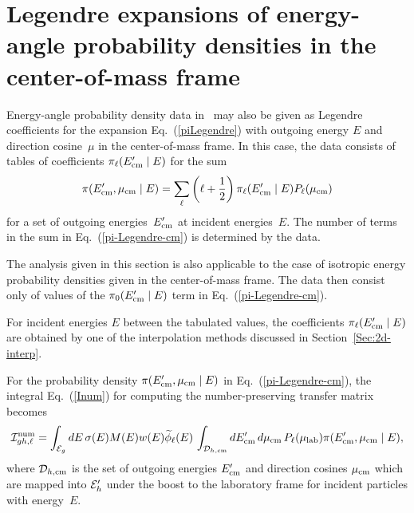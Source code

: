 \chapter{Legendre expansions of energy-angle probability densities
in the center-of-mass frame}
\label{Ch:Legendre-cm}

Energy-angle probability density data in \xendl\ may also be given
as Legendre coefficients for the expansion Eq.~(\ref{piLegendre})
with outgoing energy $E$ and direction cosine~$\mu$ in the center-of-mass 
frame.  In this case,
the data consists of tables of coefficients $\pi_\ell( E_{\text{cm}}' \mid E)$
for the sum
\begin{equation}
  \pi( E_{\text{cm}}', \mu_{\text{cm}} \mid E) = \sum_\ell
  \left(
    \ell + \frac{1}{2}
  \right)
  \pi_\ell( E_{\text{cm}}' \mid E) P_\ell( \mu_{\text{cm}} )
 \label{pi-Legendre-cm}
\end{equation}
for a set of outgoing energies~$E_{\text{cm}}'$ at incident energies~$E$.
The number of terms in the sum in Eq.~(\ref{pi-Legendre-cm})
is determined by the data.

The analysis given in this section is also applicable to the case
of isotropic energy probability densities given
in the center-of-mass frame.  The data then consist only of
values of the $\pi_0( E_{\text{cm}}' \mid E)$ term in Eq.~(\ref{pi-Legendre-cm}).

For incident energies $E$ between the tabulated values,
the coefficients $\pi_\ell( E_{\text{cm}}' \mid E)$ are obtained by one of
the interpolation methods discussed in Section~\ref{Sec:2d-interp}.

For the probability density $\pi( E_{\text{cm}}', \mu_{\text{cm}} \mid E) $ in
Eq.~(\ref{pi-Legendre-cm}), the integral Eq.~(\ref{Inum})
for computing the number-preserving transfer matrix becomes
\begin{equation}
  {\cal I}^{\text{num}}_{gh,\ell} =
         \int_{{\cal E}_g} dE \, \sigma ( E ) M(E) w(E) \widetilde \phi_\ell(E) 
       \, \int_{ {\cal D}_{h, \text{cm} }} d E_{\text{cm}}' \, d\mu_{\text{cm}} \,
             P_\ell( \mu_{\text{lab}} ) \pi( E_{\text{cm}}', \mu_{\text{cm}} \mid E) ,
 \label{Inum-Legendre-cm}
\end{equation}
where ${\cal D}_{h, \text{cm}}$ is the set of outgoing energies $E_{\text{cm}}'$
and direction cosines $\mu_{\text{cm}}$ which are mapped into ${\cal E}_h'$
under the boost to the laboratory frame for incident particles with energy~$E$.

